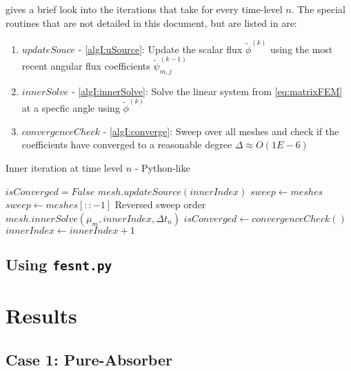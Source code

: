 \documentclass{article}
\newcommand{\fepsi}{\tilde{\psi}}
\newcommand{\fepsimj}{\fepsi_{m,j}}
\newcommand{\fephi}{\tilde{\phi}}
\begin{document}
 gives a brief look into the iterations that take for every time-level
$n$.
The special routines that are not detailed in this document, but are listed in 
 are:
\begin{enumerate}
    \item $updateSouce$ - \cref{algI:uSource}: Update the scalar flux $\fephi^{(k)}$ using the 
        most recent angular flux coefficients $\fepsimj^{(k-1)}$
    \item $innerSolve$ - \cref{algI:innerSolve}: Solve the linear system from \cref{eq:matrixFEM} at a specfic
        angle using $\fephi^{(k)}$
    \item $convergenceCheck$ - \cref{algI:converge}: Sweep over all meshes and check if the coefficients have
        converged to a reasonable degree $\Delta\approx O(1E-6)$
\end{enumerate}
\begin{algorithm}
    \caption{Inner iteration at time level $n$ - Python-like}
    \label{alg:inner}
    \begin{algorithmic}[1]
    \State $isConverged = False$
            \State $mesh.updateSource(innerIndex)$ \label{algI:uSource}
        \EndFor
                \State $sweep\gets meshes$
            \Else
                \State $sweep \gets meshes[::-1]$
                \Comment Reversed sweep order
            \EndIf
                \State $mesh.innerSolve(\mu_m, innerIndex, \Delta t_n)$
                \label{algI:innerSolve}
            \EndFor
        \EndFor
        \State $isConverged\gets convergenceCheck()
        \label{algI:converge}
        $\State $innerIndex\gets innerIndex + 1$
    \EndWhile
    \end{algorithmic}
\end{algorithm}
\subsection{Using \texttt{fesnt.py}} \label{sec:usage}

\section{Results} \label{sec:results}

\subsection{Case 1: Pure-Absorber} \label{sec:pa}
\end{document}
